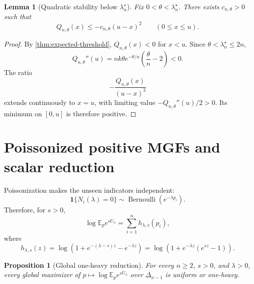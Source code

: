 \documentclass[11pt]{article}
\theoremstyle{plain}
\newtheorem{proposition}[theorem]{Proposition}
\newtheorem{lemma}[theorem]{Lemma}
\theoremstyle{definition}
\theoremstyle{remark}
\newcommand{\E}{\mathbb E}
\newcommand{\one}{\mathbf 1}
\newcommand{\simplex}{\Delta_{n-1}}
\begin{document}
\begin{lemma}[Quadratic stability below \(\lambda_n^\star\)]\label{lem:expected-quadratic-stability}
Fix \(0<\theta<\lambda_n^\star\).  There exists \(c_{n,\theta}>0\) such that
\[
Q_{n,\theta}(x)\le-c_{n,\theta}(u-x)^2
\qquad(0\le x\le u).
\]
\end{lemma}

\begin{proof}
By \cref{thm:expected-threshold}, \(Q_{n,\theta}(x)<0\) for \(x<u\).  Since \(\theta<\lambda_n^\star\le2n\),
\[
Q_{n,\theta}''(u)=nk\theta e^{-\theta/n}\left(\frac\theta n-2\right)<0.
\]
The ratio
\[
-\frac{Q_{n,\theta}(x)}{(u-x)^2}
\]
extends continuously to \(x=u\), with limiting value \(-Q_{n,\theta}''(u)/2>0\).  Its minimum on \([0,u]\) is therefore positive.
\end{proof}

\section{Poissonized positive MGFs and scalar reduction}

Poissonization makes the unseen indicators independent:
\[
\one\{N_i(\lambda)=0\}\sim\operatorname{Bernoulli}(e^{-\lambda p_i}).
\]
Therefore, for \(s>0\),
\begin{equation}\label{eq:poisson-mgf}
\log\E_p e^{sU_\lambda}
=\sum_{i=1}^n h_{\lambda,s}(p_i),
\end{equation}
where
\begin{equation}\label{eq:h-def-new}
h_{\lambda,s}(z)
=\log\left(1+e^{-(\lambda-s)z}-e^{-\lambda z}\right)
=\log\left(1+e^{-\lambda z}(e^{sz}-1)\right).
\end{equation}

\begin{proposition}[Global one-heavy reduction]\label{prop:mgf-one-heavy}
For every \(n\ge2\), \(s>0\), and \(\lambda>0\), every global maximizer of \(p\mapsto\log\E_p e^{sU_\lambda}\) over \(\simplex\) is uniform or one-heavy.
\end{proposition}
\end{document}

